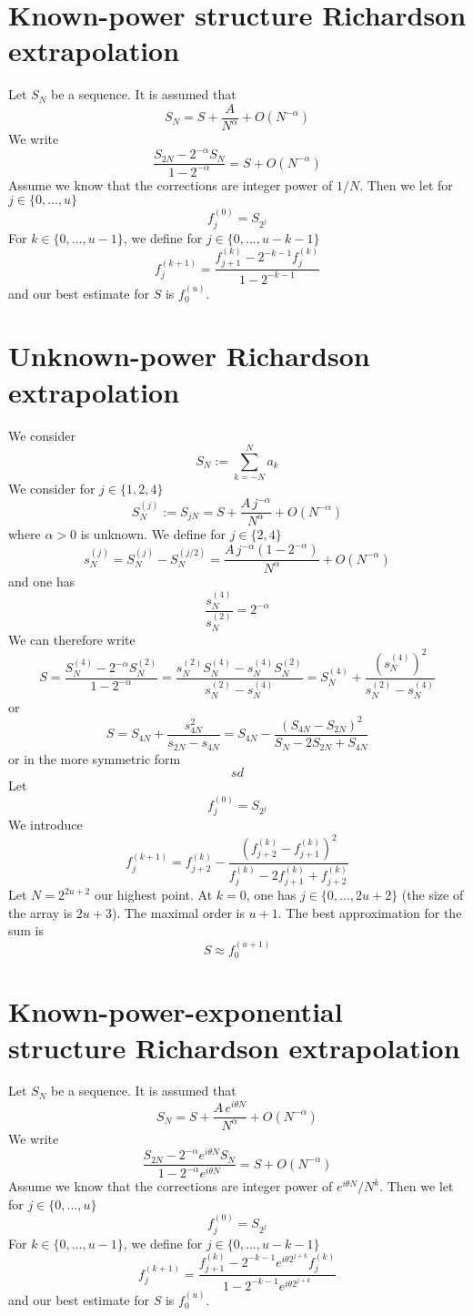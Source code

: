 \documentclass{article}
\begin{document}
\section{Known-power structure Richardson extrapolation}
Let $S_N$ be a sequence. It is assumed that
$$
S_{N} = S + \frac{A}{N^\alpha} +O(N^{-\alpha}) 
$$
We write
$$
\frac{S_{2N} -2^{-\alpha} S_N}{1-2^{-\alpha}} = S + O(N^{-\alpha})
$$
Assume we know that the corrections are integer power of $1/N$. Then we let for $j\in\{0, ..., u\}$
$$
f_j^{(0)} = S_{2^j}
$$
For $k\in\{0,...,u-1\}$, we define for $j\in\{0, ... ,u-k-1\}$
$$
f_j^{(k+1)}= \frac{f_{j+1}^{(k)}-2^{-k-1}f_j^{(k)}}{1-2^{-k-1}}
$$
and our best estimate for $S$ is $f_0^{(u)}$.
\section{Unknown-power Richardson extrapolation}
We consider
$$
S_{N} := \sum_{k=-N}^N a_k
$$
We consider for $j\in\{1, 2,4\}$
$$
S^{(j)}_N := S_{j N} = S +\frac{A\, j^{-\alpha}}{N^{\alpha}}+ O(N^{-\alpha})
$$
where $\alpha>0$ is unknown.
We define for $j\in\{2,4\}$
$$
s^{(j)}_N= S_N^{(j)}-S_N^{(j/2)}= \frac{A\,j^{-\alpha} (1-2^{-\alpha})}{N^{\alpha}}+ O(N^{-\alpha})
$$
and one has
$$
\frac{s_N^{(4)}}{s_N^{(2)}}= 2^{-\alpha}
$$
We can therefore write
$$
S = \frac{S_N^{(4)}-2^{-\alpha}S_{N}^{(2)}}{1-2^{-\alpha}} = \frac{s_N^{(2)}S_N^{(4)}-s_N^{(4)}S_N^{(2)}}{s_N^{(2)}-s_N^{(4)}}=S_N^{(4)}+\frac{(s_N^{(4)})^2}{s_N^{(2)}-s_N^{(4)}}
$$
or
$$
S = S_{4N}+\frac{s_{4N}^2}{s_{2N}-s_{4N}}= S_{4N} -\frac{(S_{4N}-S_{2N})^2}{S_N-2S_{2N}+S_{4N}}
$$
or in the more symmetric form
$$
sd
$$
Let
$$
f_j^{(0)} = S_{2^j}
$$
We introduce
$$
f^{(k+1)}_j = f^{(k)}_{j+2} - \frac{(f_{j+2}^{(k)}-f_{j+1}^{(k)})^2}{f_j^{(k)}-2f_{j+1}^{(k)}+f_{j+2}^{(k)}}
$$
Let $N=2^{2u+2}$ our highest point. At $k=0$, one has $j\in\{0,...,2u+2\}$ (the size of the array is $2u+3$). The maximal order is $u+1$. The best approximation for the sum is
$$
S \approx f^{(u+1)}_0
$$
\section{Known-power-exponential structure Richardson extrapolation}
Let $S_N$ be a sequence. It is assumed that
$$
S_{N} = S + \frac{A\, e^{i\theta N}}{N^\alpha} +O(N^{-\alpha}) 
$$
We write
$$
\frac{S_{2N} -2^{-\alpha} e^{i\theta N}S_N}{1-2^{-\alpha}e^{i\theta N}} = S + O(N^{-\alpha})
$$
Assume we know that the corrections are integer power of $e^{i\theta N}/N^k$. Then we let for $j\in\{0, ..., u\}$
$$
f_j^{(0)} = S_{2^j}
$$
For $k\in\{0,...,u-1\}$, we define for $j\in\{0, ... ,u-k-1\}$
$$
f_j^{(k+1)}= \frac{f_{j+1}^{(k)}-2^{-k-1}e^{i\theta 2^{j+k}}f_j^{(k)}}{1-2^{-k-1}e^{i\theta 2^{j+k}}}
$$
and our best estimate for $S$ is $f_0^{(u)}$.
\end{document}
